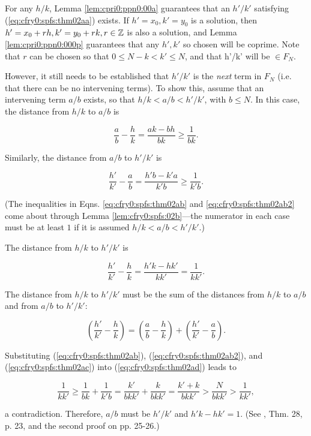 \begin{vworktheoremproof}
For any $h/k$, Lemma \ref{lem:cpri0:ppn0:00a} guarantees
that an $h'/k'$ satisfying (\ref{eq:cfry0:spfs:thm02aa}) exists.
If $h'=x_0, k'=y_0$ is a solution, then
$h'=x_0 + r h, k'=y_0 + r k, r \in {\mathbb{Z}}$ is also
a solution, and Lemma \ref{lem:cpri0:ppn0:000p}
guarantees that any $h', k'$ so chosen will be coprime.
Note that $r$ can be chosen so that $0 \leq N-k < k' \leq N$, and
that h'/k' will be $\in F_N$.

However, it still needs to be established that $h'/k'$ is the
\emph{next} term in $F_N$ (i.e. that there can be no intervening
terms).  To show this, assume that an intervening term
$a/b$ exists, so that $h/k < a/b < h'/k'$, with $b \leq N$.
In this case, the distance from $h/k$ to $a/b$ is

\begin{equation}
\label{eq:cfry0:spfs:thm02ab}
\frac{a}{b}-\frac{h}{k} = \frac{ak-bh}{bk} \geq \frac{1}{bk} .
\end{equation}

Similarly, the distance from $a/b$ to $h'/k'$ is

\begin{equation}
\label{eq:cfry0:spfs:thm02ab2}
\frac{h'}{k'}-\frac{a}{b} = \frac{h'b-k'a}{k'b} \geq \frac{1}{k'b} .
\end{equation}

(The inequalities in Eqns. \ref{eq:cfry0:spfs:thm02ab}
and \ref{eq:cfry0:spfs:thm02ab2} come
about through Lemma \ref{lem:cfry0:spfs:02b}---the numerator
in each case must be at least $1$ if it is assumed 
$h/k < a/b < h'/k'$.)

The distance from $h/k$ to $h'/k'$ is

\begin{equation}
\label{eq:cfry0:spfs:thm02ac}
\frac{h'}{k'}-\frac{h}{k} = \frac{h'k-hk'}{kk'} = \frac{1}{kk'} .
\end{equation}

The distance from $h/k$ to $h'/k'$ must be the sum of the distances
from $h/k$ to $a/b$ and from $a/b$ to $h'/k'$:

\begin{equation}
\label{eq:cfry0:spfs:thm02ad}
\left( { \frac{h'}{k'} - \frac{h}{k} } \right)
=
\left( { \frac{a}{b} - \frac{h}{k} } \right)
+
\left( { \frac{h'}{k'} - \frac{a}{b} } \right) .
\end{equation}

Substituting (\ref{eq:cfry0:spfs:thm02ab}),
(\ref{eq:cfry0:spfs:thm02ab2}), 
and (\ref{eq:cfry0:spfs:thm02ac}) 
into (\ref{eq:cfry0:spfs:thm02ad}) leads 
to

\begin{equation}
\label{eq:cfry0:spfs:thm02ae}
\frac{1}{kk'}
\geq
\frac{1}{bk}+\frac{1}{k'b}
=\frac{k'}{bkk'}+\frac{k}{bkk'}
=\frac{k'+k}{bkk'}
>
\frac{N}{bkk'}
>
\frac{1}{kk'} ,
\end{equation}

a contradiction.  Therefore, $a/b$ must be $h'/k'$ and 
$h'k-hk'=1$.  (See \cite{bibref:b:HardyAndWrightClassic}, Thm. 28, p. 23,
and the second proof on pp. 25-26.)
\end{vworktheoremproof}

